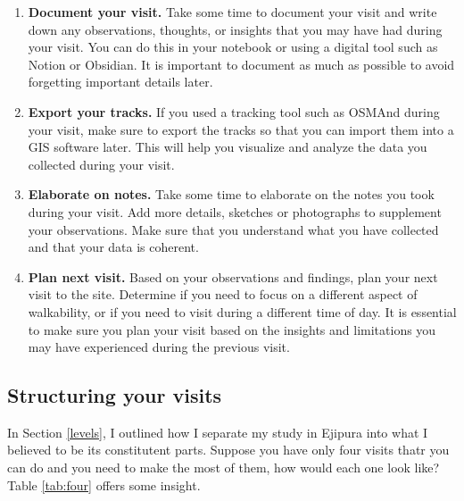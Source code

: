 \documentclass[
]{latex/krantz}
\begin{document}
\begin{enumerate}
\def\labelenumi{\arabic{enumi}.}
\item
  \textbf{Document your visit.} Take some time to document your visit and write down any observations, thoughts, or insights that you may have had during your visit. You can do this in your notebook or using a digital tool such as Notion or Obsidian. It is important to document as much as possible to avoid forgetting important details later.
\item
  \textbf{Export your tracks.} If you used a tracking tool such as OSMAnd during your visit, make sure to export the tracks so that you can import them into a GIS software later. This will help you visualize and analyze the data you collected during your visit.
\item
  \textbf{Elaborate on notes.} Take some time to elaborate on the notes you took during your visit. Add more details, sketches or photographs to supplement your observations. Make sure that you understand what you have collected and that your data is coherent.
\item
  \textbf{Plan next visit.} Based on your observations and findings, plan your next visit to the site. Determine if you need to focus on a different aspect of walkability, or if you need to visit during a different time of day. It is essential to make sure you plan your visit based on the insights and limitations you may have experienced during the previous visit.
\end{enumerate}

\hypertarget{structuring-your-visits}{%
\subsection{Structuring your visits}\label{structuring-your-visits}}

In Section \ref{levels}, I outlined how I separate my study in Ejipura into what I believed to be its constitutent parts. Suppose you have only four visits thatr you can do and you need to make the most of them, how would each one look like? Table \ref{tab:four} offers some insight.
\end{document}
